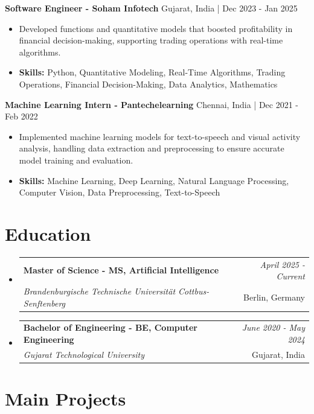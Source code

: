 \documentclass[a4paper,11pt]{article}
\makeatletter
\newcommand{\resumeSubheading}[4]{
\vspace{0.5mm}\item
    \begin{tabular*}{0.98\textwidth}[t]{l@{\extracolsep{\fill}}r}
        \textbf{#1} & \textit{\footnotesize{#4}} \\
        \textit{\footnotesize{#3}} &  \footnotesize{#2}\\
    \end{tabular*}
    \vspace{-2.4mm}
}
\makeatother
\begin{document}
\vspace{1mm}
  \textbf{Software Engineer - Soham Infotech} \hfill Gujarat, India | Dec 2023 - Jan 2025
\vspace{-1.5mm} %
\begin{itemize}
  \item Developed functions and quantitative models that boosted profitability in financial decision-making, supporting trading operations with real-time algorithms.

\vspace{-2mm}
  \item \textbf{Skills:} Python, Quantitative Modeling, Real-Time Algorithms, Trading Operations, Financial Decision-Making, Data Analytics, Mathematics
\end{itemize}

\vspace{1mm}
  \textbf{Machine Learning Intern - Pantechelearning} \hfill Chennai, India | Dec 2021 - Feb 2022
\vspace{-1.5mm} %
\begin{itemize}
  \item Implemented machine learning models for text-to-speech and visual activity analysis, handling data extraction and preprocessing to ensure accurate model training and evaluation.
\vspace{-2mm}
  \item \textbf{Skills:} Machine Learning, Deep Learning, Natural Language Processing, Computer Vision, Data Preprocessing, Text-to-Speech
\end{itemize}\section{\textbf{Education}}
\vspace{-0.4mm}

\begin{itemize}
\resumeSubheading
{Master of Science - MS, Artificial Intelligence }{Berlin, Germany}
{Brandenburgische Technische Universität Cottbus-Senftenberg  }{April 2025 - Current}

\vspace{1.0mm} %
\resumeSubheading
{Bachelor of Engineering - BE, Computer Engineering  }{Gujarat, India}
{Gujarat Technological University }{June 2020 - May 2024}

\end{itemize}
\section{\textbf{Main Projects}}
\end{document}
